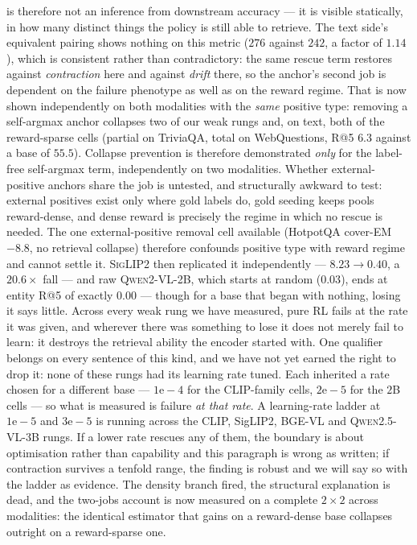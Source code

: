 is therefore not an inference from downstream accuracy --- it is visible statically, in how many
distinct things the policy is still able to retrieve. The text side's equivalent pairing shows
nothing on this metric ($276$ against $242$, a factor of $1.14$), which is consistent rather than
contradictory: the same rescue term restores against \emph{contraction} here and against
\emph{drift} there, so the anchor's second job is dependent on the failure phenotype as well as
on the reward regime. That is now shown
independently on both modalities with the \emph{same} positive type: removing a self-argmax
anchor collapses two of our weak rungs and, on text, both of the reward-sparse cells
(partial on TriviaQA, total on WebQuestions, R@5 $6.3$ against a base of $55.5$). Collapse prevention is therefore demonstrated
\emph{only} for the label-free self-argmax term, independently on two modalities. Whether
external-positive anchors share the job is untested, and structurally awkward to test: external
positives exist only where gold labels do, gold seeding keeps pools reward-dense, and dense
reward is precisely the regime in which no rescue is needed. The one external-positive removal
cell available (HotpotQA cover-EM $-8.8$, no retrieval collapse) therefore confounds positive
type with reward regime and cannot settle it.
\textsc{SigLIP2} then replicated it
independently --- $8.23 \to 0.40$, a $20.6\times$ fall --- and raw \textsc{Qwen2-VL-2B}, which
starts at random ($0.03$), ends at entity R@5 of exactly $0.00$ --- though for a base that began
with nothing, losing it says little. Across every weak rung we have measured, pure RL fails at
the rate it was given, and wherever there was something to lose it does not merely fail to learn:
it destroys the retrieval ability the encoder started with. One qualifier belongs on every sentence
of this kind, and we have not yet earned the right to drop it: none of these rungs had its
learning rate tuned. Each inherited a rate chosen for a different base --- $1\mathrm{e}{-}4$ for
the CLIP-family cells, $2\mathrm{e}{-}5$ for the $2$B cells --- so what is measured is failure
\emph{at that rate}. A learning-rate ladder at $1\mathrm{e}{-}5$ and $3\mathrm{e}{-}5$ is running
across the CLIP, SigLIP2, \textsc{BGE-VL} and \textsc{Qwen2.5-VL-3B} rungs. If a lower rate
rescues any of them, the boundary is about optimisation rather than capability and this
paragraph is wrong as written; if contraction survives a tenfold range, the finding is robust and
we will say so with the ladder as evidence. The
density branch fired, the structural explanation is dead, and the two-jobs account is now
measured on a complete $2\times2$ across modalities: the identical estimator that gains on a
reward-dense base collapses outright on a reward-sparse one.

